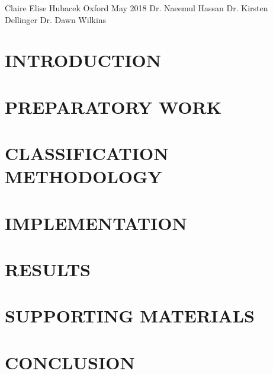 \documentclass{report}
\begin{document}
{Claire Elise Hubacek}
{Oxford}
{May 2018}
{Dr. Naeemul Hassan}
{Dr. Kirsten Dellinger}
{Dr. Dawn Wilkins}

\initializefrontsections
{}

\startacknowledgementspage{

}

\startabstractpage {

}



\producetableofcontents{}
\listoffigures
\listoftables
\listofabbreviations

\startthechapters

\chapter{INTRODUCTION}{

}

\chapter{PREPARATORY WORK}{

}

\chapter{CLASSIFICATION METHODOLOGY}{

}

\chapter{IMPLEMENTATION}{

}

\chapter{RESULTS}{

}

\chapter{SUPPORTING MATERIALS}{

}

\chapter{CONCLUSION}{

}

\startbibliography



\end{document}
